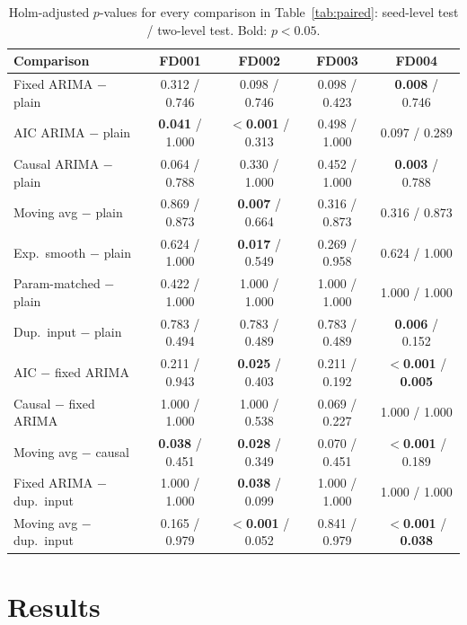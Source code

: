 \documentclass[conference]{IEEEtran}
\begin{document}
\begin{table}[t]
\centering
\caption{Holm-adjusted $p$-values for every comparison in Table~\ref{tab:paired}: seed-level test / two-level test. Bold: $p<0.05$.}
\label{tab:pvals}
\footnotesize
\setlength{\tabcolsep}{5pt}
\begin{tabular}{lcccc}
\toprule
Comparison & FD001 & FD002 & FD003 & FD004 \\
\midrule
Fixed ARIMA $-$ plain & 0.312 / 0.746 & 0.098 / 0.746 & 0.098 / 0.423 & \textbf{0.008} / 0.746 \\
AIC ARIMA $-$ plain & \textbf{0.041} / 1.000 & \textbf{$<$0.001} / 0.313 & 0.498 / 1.000 & 0.097 / 0.289 \\
Causal ARIMA $-$ plain & 0.064 / 0.788 & 0.330 / 1.000 & 0.452 / 1.000 & \textbf{0.003} / 0.788 \\
Moving avg $-$ plain & 0.869 / 0.873 & \textbf{0.007} / 0.664 & 0.316 / 0.873 & 0.316 / 0.873 \\
Exp.\ smooth $-$ plain & 0.624 / 1.000 & \textbf{0.017} / 0.549 & 0.269 / 0.958 & 0.624 / 1.000 \\
Param-matched $-$ plain & 0.422 / 1.000 & 1.000 / 1.000 & 1.000 / 1.000 & 1.000 / 1.000 \\
Dup.\ input $-$ plain & 0.783 / 0.494 & 0.783 / 0.489 & 0.783 / 0.489 & \textbf{0.006} / 0.152 \\
AIC $-$ fixed ARIMA & 0.211 / 0.943 & \textbf{0.025} / 0.403 & 0.211 / 0.192 & \textbf{$<$0.001} / \textbf{0.005} \\
Causal $-$ fixed ARIMA & 1.000 / 1.000 & 1.000 / 0.538 & 0.069 / 0.227 & 1.000 / 1.000 \\
Moving avg $-$ causal & \textbf{0.038} / 0.451 & \textbf{0.028} / 0.349 & 0.070 / 0.451 & \textbf{$<$0.001} / 0.189 \\
Fixed ARIMA $-$ dup.\ input & 1.000 / 1.000 & \textbf{0.038} / 0.099 & 1.000 / 1.000 & 1.000 / 1.000 \\
Moving avg $-$ dup.\ input & 0.165 / 0.979 & \textbf{$<$0.001} / 0.052 & 0.841 / 0.979 & \textbf{$<$0.001} / \textbf{0.038} \\
\bottomrule
\end{tabular}
\end{table}

\section{Results}
\end{document}
